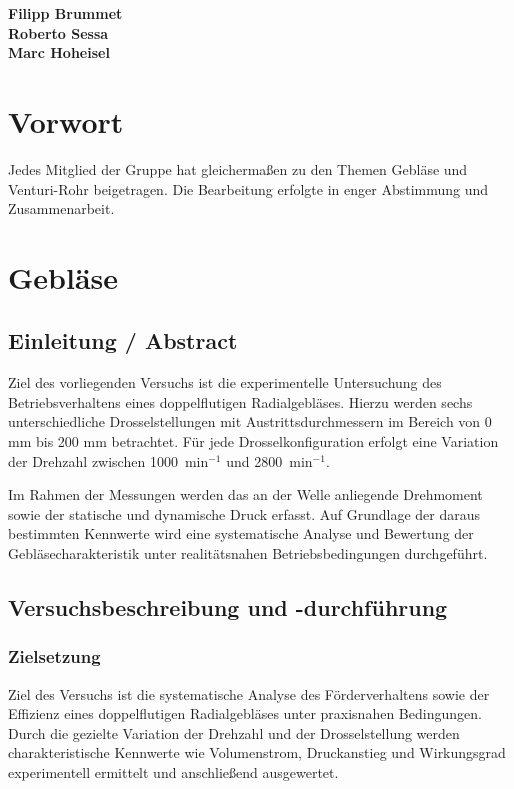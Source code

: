 \documentclass[pdfpaper,openbib, twoside, titlepage, halfparskip-,a4paper, 10pt]{scrarticle}
\begin{document}
\begin{titlepage}
\vspace{3cm}
\begin{flushleft}
\textbf{Filipp Brummet} \\
\vspace{0.75cm}
\textbf{Roberto Sessa} \\
\vspace{0.75cm}
\textbf{Marc Hoheisel} \\

\end{flushleft}
\end{titlepage}
\section*{Vorwort}
Jedes Mitglied der Gruppe hat gleichermaßen zu den Themen Gebläse und Venturi-Rohr beigetragen. Die Bearbeitung erfolgte in enger Abstimmung und Zusammenarbeit.
\newpage
\tableofcontents
\newpage

\section{Gebläse}
\subsection{Einleitung / Abstract}
Ziel des vorliegenden Versuchs ist die experimentelle Untersuchung des Betriebsverhaltens eines doppelflutigen Radialgebläses. Hierzu werden sechs unterschiedliche Drosselstellungen mit Austrittsdurchmessern im Bereich von 0 mm bis 200 mm betrachtet. Für jede Drosselkonfiguration erfolgt eine Variation der Drehzahl zwischen 1000~min$^{-1}$ und 2800~min$^{-1}$. 

Im Rahmen der Messungen werden das an der Welle anliegende Drehmoment sowie der statische und dynamische Druck erfasst. Auf Grundlage der daraus bestimmten Kennwerte wird eine systematische Analyse und Bewertung der Gebläsecharakteristik unter realitätsnahen Betriebsbedingungen durchgeführt.


\subsection{Versuchsbeschreibung und -durchführung}
\subsubsection{Zielsetzung}
Ziel des Versuchs ist die systematische Analyse des Förderverhaltens sowie der Effizienz eines doppelflutigen Radialgebläses unter praxisnahen Bedingungen. Durch die gezielte Variation der Drehzahl und der Drosselstellung werden charakteristische Kennwerte wie Volumenstrom, Druckanstieg und Wirkungsgrad experimentell ermittelt und anschließend ausgewertet.
\end{document}
